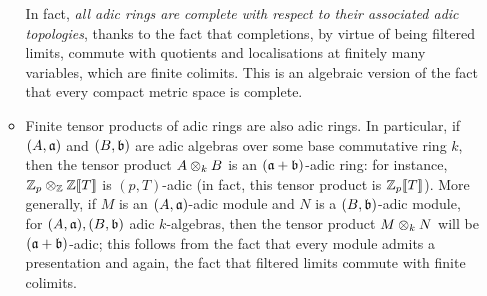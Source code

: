 \begin{example}
\begin{enumerate}
\begin{itemize}
                                In fact, \textit{all adic rings are complete with respect to their associated adic topologies}, thanks to the fact that completions, by virtue of being filtered limits, commute with quotients and localisations at finitely many variables, which are finite colimits. This is an algebraic version of the fact that every compact metric space is complete.  
                                \item Finite tensor products of adic rings are also adic rings. In particular, if $(A, \mathfrak{a})$ and $(B, \mathfrak{b})$ are adic algebras over some base commutative ring $k$, then the tensor product $A \tensor_k B$ is an $(\mathfrak{a} + \mathfrak{b})$-adic ring: for instance, $\Z_p \tensor_{\Z} \Z[\![T]\!]$ is $(p, T)$-adic (in fact, this tensor product is $\mathbb{Z}_p[\![T]\!]$). More generally, if $M$ is an $(A, \mathfrak{a})$-adic module and $N$ is a $(B, \mathfrak{b})$-adic module, for $(A, \mathfrak{a}), (B, \mathfrak{b})$ adic $k$-algebras, then the tensor product $M \tensor_k N$ will be $(\mathfrak{a} + \mathfrak{b})$-adic; this follows from the fact that every module admits a presentation and again, the fact that filtered limits commute with finite colimits. 
                                

\end{itemize}
\end{enumerate}
\end{example}
